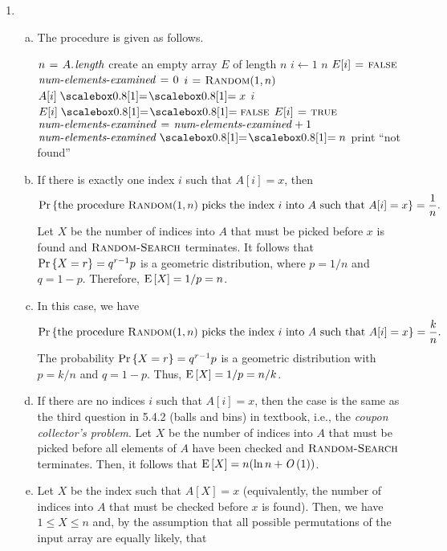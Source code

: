 \begin{enumerate}[\thechapter-1]
\begin{enumerate}[(a)]
\end{enumerate}
%
\item
\begin{enumerate}[(a)]
\item The procedure is given as follows.
\begin{codebox}
\li $n \gets \attrib{A}{length}$
\li create an empty array $E$ of length $n$
\li \For $i \gets 1$ \To $n$
\li \Do
        $E[i] \mathrel{\hspace{1pt}=\hspace{1pt}} \textnormal{\scshape false}$
    \End
\li $\id{num-elements-examined} \gets 0$
\li \Repeat
\li      $i \mathrel{\hspace{1pt}=\hspace{1pt}} \textnormal{\scshape Random}(1, n)$
\li      \If $A[i] \isequal x$
\li          \Then
                   \Return $i$
\li          \Else
                   \If $E[i] \isequal \const{false}$
\li                    \Then
                             $E[i] \mathrel{\hspace{1pt}=\hspace{1pt}} \textnormal{\scshape true}$
\li                          $\id{num-elements-examined} \gets \id{num-elements-examined} + 1$
                       \End
             \End
\li \Until $\id{num-elements-examined} \isequal n$
\li print ``not found''
\end{codebox}
\item If there is exactly one index $i$ such that $A[i] = x$, then
\[
\pr{\mathtext{the procedure \mathmode{\proc{Random}(1, n)} picks the index \mathmode{i} into \mathmode{A} such that \mathmode{A[i] = x}}} = \frac{1}{n}.
\]
Let $X$ be the number of indices into $A$ that must be picked before $x$ is found and $\textnormal{\scshape Random-Search}$ terminates. It follows that $\Pr\left\{X = r\right\} = q^{r - 1}p$ is a geometric distribution, where $p = 1/n$ and $q = 1 - p$. Therefore, $\mathrm{E}\left[X\right] = 1/p = n$.
\item In this case, we have
\[
\pr{\mathtext{the procedure \mathmode{\proc{Random}(1, n)} picks the index \mathmode{i} into \mathmode{A} such that \mathmode{A[i] = x}}} = \frac{k}{n}.
\]
The probability $\Pr\left\{X = r\right\} = q^{r - 1}p$ is a geometric distribution with $p = k/n$ and $q = 1 - p$. Thus, $\mathrm{E}\left[X\right] = 1/p = n/k$.
\item If there are no indices $i$ such that $A[i] = x$, then the case is the same as the third question in 5.4.2 (balls and bins) in textbook, i.e., the \emph{coupon collector's problem}. Let $X$ be the number of indices into $A$ that must be picked before all elements of $A$ have been checked and $\textnormal{\scshape Random-Search}$ terminates. Then, it follows that $\mathrm{E}\left[X\right] = n(\ln n + \mathit{O}\left(1\right))$.
\item Let $X$ be the index such that $A[X] = x$ (equivalently, the number of indices into $A$ that must be checked before $x$ is found). Then, we have $1 \leq X \leq n$ and, by the assumption that all possible permutations of the input array are equally likely, that

\end{enumerate}
\end{enumerate}
